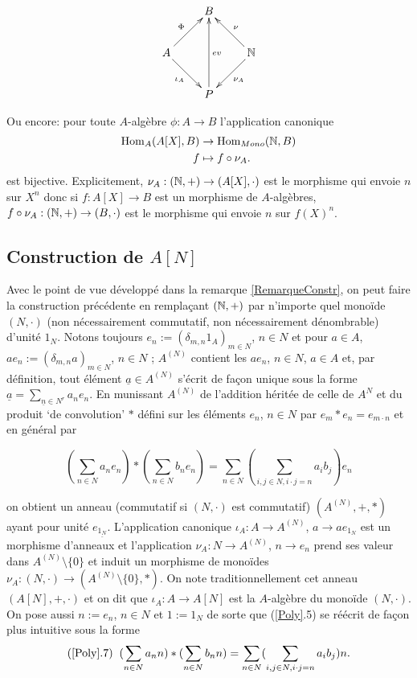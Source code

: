 \[\xymatrix{ & B \\ A \ar[ru]^\Phi \ar[rd]_{\iota_A} & & \mathbb{N} \ar[lu]_\nu
\ar[ld]^{\nu_A} \\ & P \ar[uu]_{ev} }\]

Ou encore: pour toute $A$-algèbre $\phi:A\rightarrow B$  l'application
canonique \begin{align}\operatorname{Hom}_A(A[X],B) &\to \operatorname{Hom}_{Mono}(\mathbb{N},B) \\ f &\mapsto
f\circ \nu_A.\end{align} est bijective. Explicitement, $\nu_A:(\mathbb{N},+)\rightarrow
(A[X],\cdot)$ est le morphisme qui envoie $n$ sur $X^n$ donc si
$f:A[X]\rightarrow B$ est un morphisme de $A$-algèbres, $f\circ
\nu_A:(\mathbb{N},+)\rightarrow (B,\cdot)$  est le morphisme qui envoie $n$ sur
$f(X)^n$.\\

\subsection{Construction de $A[N]$}

Avec le point de vue développé dans la remarque \ref{RemarqueConstr}, on peut
faire la construction précédente en remplaçant $(\mathbb{N},+)$ par n'importe quel
monoïde $(N,\cdot)$ (non nécessairement commutatif, non nécessairement
dénombrable) d'unité $1_N$.   Notons toujours $e_{n}:=(\delta_{m,n}1_{A})_{m\in
N}$, $n\in N$ et pour $a\in A$, $ae_{n}:=(\delta_{m,n}a)_{m\in  N}$, $n\in N$ ;
$A^{(N)}$ contient les $ae_{n}$, $n\in N$, $a\in A$ et, par définition,  tout
élément $\underline{a}\in A^{(N)}$ s'écrit de façon unique sous la forme
$\underline{a}=\sum_{\underline{n}\in N^r}a_ne_{n}$. En munissant $A^{(N)}$ de
l'addition héritée de celle de $A^{N}$ et du produit `de convolution' $*$
défini sur les éléments $e_{n}$, $n\in N$ par $e_{m}*e_{n}=e_{m\cdot n} $ et en
général par

\begin{equation}
    (\sum_{n\in N}a_{n}e_{n}) *(\sum_{n\in N}b_{n}e_{n})=\sum_{n\in
    N}(\sum_{i,j\in N,i\cdot j=n}a_{i}b_{j})e_{n}
\end{equation}

on obtient un anneau (commutatif si $(N,\cdot)$ est commutatif) $(A^{(N)},+,*)$
ayant pour unité $e_{\underline{1_N}}$. L'application canonique
$\iota_A:A\rightarrow A^{(N)}$, $a\rightarrow ae_{1_N}  $  est un morphisme
d'anneaux et l'application $\nu_A:N\rightarrow A^{(N)}$, $n\rightarrow e_n$
prend ses valeur dans $A^{(N)}\setminus\lbrace 0\rbrace$ et induit un morphisme
de monoïdes $\nu_A:(N,\cdot)\rightarrow (A^{(N)}\setminus\lbrace 0\rbrace,*)$.
On note traditionnellement cet anneau $(A[N],+,\cdot) $ et on dit que
$\iota_A:A\rightarrow A[N]$ est la $A$-algèbre du monoïde $(N,\cdot)$. On pose
aussi $n:=e_{n}$, $n\in N$    et $1:=1_N$ de sorte que (\ref{Poly}.5) se
réécrit de façon plus intuitive sous la forme $$(\ref{Poly}.7)\;\; (\sum_{n\in
N}a_{n}n) *(\sum_{n\in N}b_{n}n)=\sum_{n\in N}(\sum_{i,j\in N,i\cdot
j=n}a_{i}b_{j})n.$$

